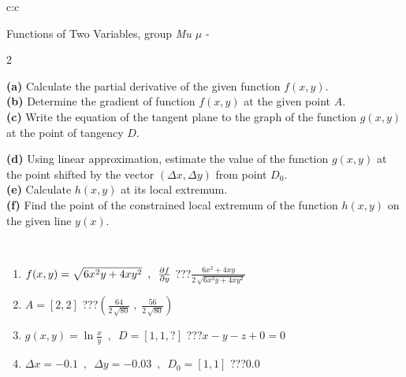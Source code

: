 \documentclass[10pt]{report}
\begin{document}
\begin{tabular}{c:c}
\begin{minipage}[c][104.5mm][t]{0.5\linewidth}
\begin{center}
\vspace{7mm}
{\huge \LARGE Functions of Two Variables, group \textit{Mu $\mu$} -}\\[5mm]
\begin{minipage}{0.95\linewidth}
\begin{center}
{\small \begin{multicols}{2} \raggedright
\textbf{(a)} Calculate the partial derivative of the given function \(f(x,y)\). \\[1mm]
\textbf{(b)} Determine the gradient of function \(f(x,y)\) at the given point \(A\). \\[1mm]
\textbf{(c)} Write the equation of the tangent plane to the graph of the function \(g(x,y)\) at the point of tangency \(D\). \par \columnbreak
\textbf{(d)} Using linear approximation, estimate the value of the function \(g(x,y)\) at the point shifted by the vector \((\Delta x, \Delta y)\) from point \(D_0\). \\[1mm]
\textbf{(e)} Calculate \(h(x,y)\) at its local extremum. \\[1mm]
\textbf{(f)} Find the point of the constrained local extremum of the function \(h(x,y)\) on the given line \(y(x)\). \\[1mm]
\end{multicols}
}
\end{center}
\end{minipage}
\\[4mm]
\begin{minipage}{0.79\linewidth}
\begin{center}
\begin{varwidth}{\linewidth}
\begin{enumerate}
\normalsizerr
\item $f(x,y) = \sqrt{6x^2y + 4xy^2}\enspace , \enspace \pdv{f}{y}$\quad \dotfill\; ???\;\dotfill \quad $\frac{6x^2+4xy}{2\,\sqrt{6x^2y+4xy^2}}$
\item $A = [2, 2]$\quad \dotfill\; ???\;\dotfill \quad $\left( \frac{64}{2\,\sqrt{80}} \;,\; \frac{56}{2\,\sqrt{80}} \right)$
\item $g(x,y) = \ln\frac{x}{y} \enspace , \enspace D=[1,1,?]$\quad \dotfill\; ???\;\dotfill \quad $x - y - z + 0 = 0$
\item $\Delta x = {-0.1} \enspace,\enspace \Delta y = {-0.03} \enspace,\enspace D_0 = [1,1]$\quad \dotfill\; ???\;\dotfill \quad $0.0$

\end{enumerate}
\end{varwidth}
\end{center}
\end{minipage}
\end{center}
\end{minipage}
\end{tabular}
\end{document}
